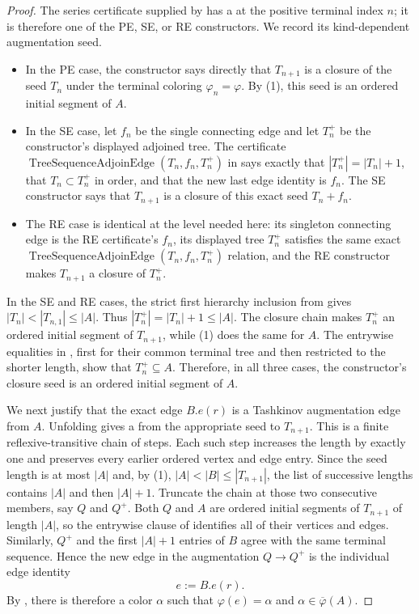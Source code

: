 \begin{proof}
The series certificate supplied by  has a
 at the positive terminal index $n$; it is
therefore one of the PE, SE, or RE constructors.  We record its
kind-dependent augmentation seed.
\begin{itemize}
\item In the PE case, the constructor says directly that $T_{n+1}$ is a
closure of the seed $T_n$ under the terminal coloring $\varphi_n=\varphi$.
By (1), this seed is an ordered initial segment of $A$.
\item In the SE case, let $f_n$ be the single connecting edge and let
$T_n^+$ be the constructor's displayed adjoined tree.  The certificate
$\operatorname{TreeSequenceAdjoinEdge}(T_n,f_n,T_n^+)$ in
 says exactly that
$|T_n^+|=|T_n|+1$, that $T_n\subset T_n^+$ in order, and that the new
last edge identity is $f_n$.  The SE constructor says that $T_{n+1}$ is
a closure of this exact seed $T_n+f_n$.
\item The RE case is identical at the level needed here: its singleton
connecting edge is the RE certificate's $f_n$, its displayed tree
$T_n^+$ satisfies the same exact
$\operatorname{TreeSequenceAdjoinEdge}(T_n,f_n,T_n^+)$ relation, and
the RE constructor makes $T_{n+1}$ a closure of $T_n^+$.
\end{itemize}
In the SE and RE cases, the strict first hierarchy inclusion from
 gives $|T_n|<|T_{n,1}|\leq |A|$.
Thus $|T_n^+|=|T_n|+1\leq|A|$.  The closure chain makes $T_n^+$ an
ordered initial segment of $T_{n+1}$, while (1) does the same for $A$.
The entrywise equalities in , first
for their common terminal tree and then restricted to the shorter
length, show that $T_n^+\subseteq A$.  Therefore, in all three cases,
the constructor's closure seed is an ordered initial segment of $A$.

We next justify that the exact edge $B.e(r)$ is a Tashkinov augmentation
edge from $A$.  Unfolding  gives a
 from the appropriate seed to
$T_{n+1}$.  This is a finite reflexive-transitive chain of
 steps.  Each such step increases the
length by exactly one and preserves every earlier ordered vertex and edge
entry.  Since the seed length is at most $|A|$ and, by (1),
$|A|<|B|\leq|T_{n+1}|$, the list of successive lengths contains $|A|$
and then $|A|+1$.  Truncate the chain at those two consecutive members,
say $Q$ and $Q^+$.  Both $Q$ and $A$ are ordered initial segments of
$T_{n+1}$ of length $|A|$, so the entrywise clause of
 identifies all of their vertices
and edges.  Similarly, $Q^+$ and the first $|A|+1$ entries of $B$ agree
with the same terminal sequence.  Hence the new edge in the augmentation
$Q\to Q^+$ is the individual edge identity
\[
                         e:=B.e(r).
\tag{2}
\]
By , there is therefore a color $\alpha$
such that $\varphi(e)=\alpha$ and
$\alpha\in\overline\varphi(A)$.


\end{proof}
